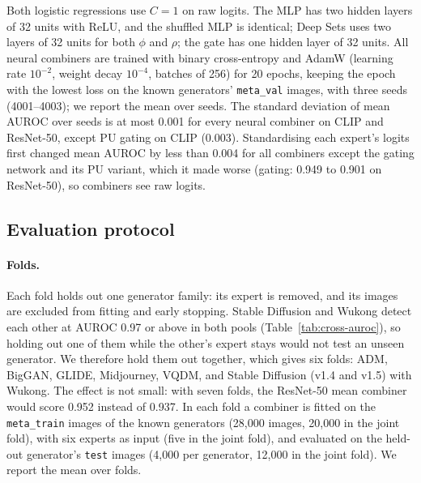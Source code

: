 \documentclass[10pt,a4paper]{article}
\begin{document}
Both logistic regressions use $C=1$ on raw logits. The MLP has two hidden layers of 32 units with ReLU, and the shuffled MLP is identical; Deep Sets uses two layers of 32 units for both $\phi$ and $\rho$; the gate has one hidden layer of 32 units. All neural combiners are trained with binary cross-entropy and AdamW (learning rate $10^{-2}$, weight decay $10^{-4}$, batches of 256) for 20 epochs, keeping the epoch with the lowest loss on the known generators' \texttt{meta\_val} images, with three seeds (4001--4003); we report the mean over seeds. The standard deviation of mean AUROC over seeds is at most 0.001 for every neural combiner on CLIP and ResNet-50, except PU gating on CLIP (0.003). Standardising each expert's logits first changed mean AUROC by less than 0.004 for all combiners except the gating network and its PU variant, which it made worse (gating: 0.949 to 0.901 on ResNet-50), so combiners see raw logits.

\subsection{Evaluation protocol}\label{sec:protocol}

\paragraph{Folds.} Each fold holds out one generator family: its expert is removed, and its images are excluded from fitting and early stopping. Stable Diffusion and Wukong detect each other at AUROC 0.97 or above in both pools (Table~\ref{tab:cross-auroc}), so holding out one of them while the other's expert stays would not test an unseen generator. We therefore hold them out together, which gives six folds: ADM, BigGAN, GLIDE, Midjourney, VQDM, and Stable Diffusion (v1.4 and v1.5) with Wukong. The effect is not small: with seven folds, the ResNet-50 mean combiner would score 0.952 instead of 0.937. In each fold a combiner is fitted on the \texttt{meta\_train} images of the known generators (28,000 images, 20,000 in the joint fold), with six experts as input (five in the joint fold), and evaluated on the held-out generator's \texttt{test} images (4,000 per generator, 12,000 in the joint fold). We report the mean over folds.
\end{document}
